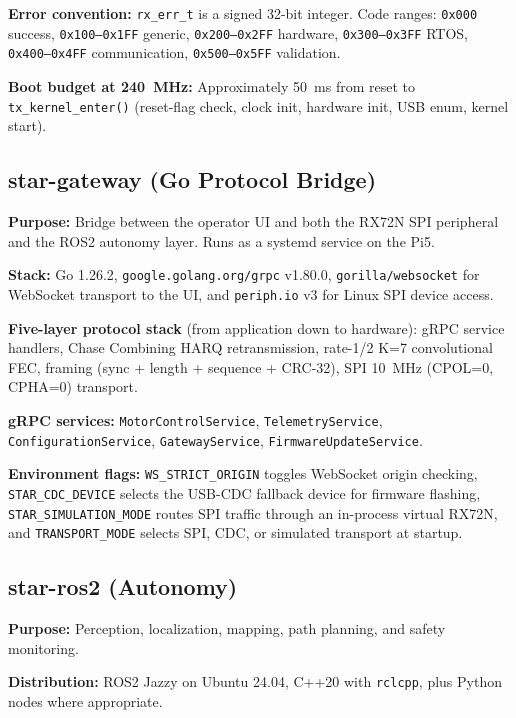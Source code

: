 \documentclass[11pt,letterpaper]{article}
\begin{document}
\textbf{Error convention:} \texttt{rx\_err\_t} is a signed 32-bit
integer. Code ranges: \texttt{0x000} success, \texttt{0x100--0x1FF}
generic, \texttt{0x200--0x2FF} hardware, \texttt{0x300--0x3FF} RTOS,
\texttt{0x400--0x4FF} communication, \texttt{0x500--0x5FF} validation.

\textbf{Boot budget at \qty{240}{\mega\hertz}:} Approximately
\qty{50}{\milli\second} from reset to \texttt{tx\_kernel\_enter()}
(reset-flag check, clock init, hardware init, USB enum, kernel start).

\subsection{star-gateway (Go Protocol Bridge)}
\textbf{Purpose:} Bridge between the operator UI and both the RX72N
SPI peripheral and the ROS2 autonomy layer. Runs as a systemd service
on the Pi5.

\textbf{Stack:} Go 1.26.2, \texttt{google.golang.org/grpc} v1.80.0,
\texttt{gorilla/websocket} for WebSocket transport to the UI, and
\texttt{periph.io} v3 for Linux SPI device access.

\textbf{Five-layer protocol stack} (from application down to
hardware): gRPC service handlers, Chase Combining HARQ retransmission,
rate-1/2 K=7 convolutional FEC, framing (sync + length + sequence +
CRC-32), SPI \qty{10}{\mega\hertz} (CPOL=0, CPHA=0) transport.

\textbf{gRPC services:} \texttt{MotorControlService},
\texttt{TelemetryService}, \texttt{ConfigurationService},
\texttt{GatewayService}, \texttt{FirmwareUpdateService}.

\textbf{Environment flags:} \texttt{WS\_STRICT\_ORIGIN} toggles
WebSocket origin checking, \texttt{STAR\_CDC\_DEVICE} selects the
USB-CDC fallback device for firmware flashing,
\texttt{STAR\_SIMULATION\_MODE} routes SPI traffic through an
in-process virtual RX72N, and \texttt{TRANSPORT\_MODE} selects
SPI, CDC, or simulated transport at startup.

\subsection{star-ros2 (Autonomy)}
\textbf{Purpose:} Perception, localization, mapping, path planning,
and safety monitoring.

\textbf{Distribution:} ROS2 Jazzy on Ubuntu 24.04, C++20 with
\texttt{rclcpp}, plus Python nodes where appropriate.
\end{document}
